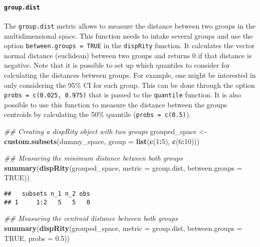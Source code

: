\documentclass[
]{book}
\newenvironment{Shaded}{\begin{snugshade}}{\end{snugshade}}
\newcommand{\CommentTok}[1]{\textcolor[rgb]{0.56,0.35,0.01}{\textit{#1}}}
\newcommand{\DataTypeTok}[1]{\textcolor[rgb]{0.13,0.29,0.53}{#1}}
\newcommand{\DecValTok}[1]{\textcolor[rgb]{0.00,0.00,0.81}{#1}}
\newcommand{\FloatTok}[1]{\textcolor[rgb]{0.00,0.00,0.81}{#1}}
\newcommand{\KeywordTok}[1]{\textcolor[rgb]{0.13,0.29,0.53}{\textbf{#1}}}
\newcommand{\NormalTok}[1]{#1}
\newcommand{\OperatorTok}[1]{\textcolor[rgb]{0.81,0.36,0.00}{\textbf{#1}}}
\newcommand{\OtherTok}[1]{\textcolor[rgb]{0.56,0.35,0.01}{#1}}
\newcommand{\StringTok}[1]{\textcolor[rgb]{0.31,0.60,0.02}{#1}}
\begin{document}
\hypertarget{group.dist}{%
\paragraph{\texorpdfstring{\texttt{group.dist}}{group.dist}}\label{group.dist}}

The \texttt{group.dist} metric allows to measure the distance between two groups in the multidimensional space.
This function needs to intake several groups and use the option \texttt{between.groups\ =\ TRUE} in the \texttt{dispRity} function.
It calculates the vector normal distance (euclidean) between two groups and returns 0 if that distance is negative.
Note that it is possible to set up which quantiles to consider for calculating the distances between groups.
For example, one might be interested in only considering the 95\% CI for each group.
This can be done through the option \texttt{probs\ =\ c(0.025,\ 0.975)} that is passed to the \texttt{quantile} function.
It is also possible to use this function to measure the distance between the groups centroids by calculating the 50\% quantile (\texttt{probs\ =\ c(0.5)}).

\begin{Shaded}
\begin{Highlighting}[]
\CommentTok{\#\# Creating a dispRity object with two groups}
\NormalTok{grouped\_space \textless{}{-}}\StringTok{ }\KeywordTok{custom.subsets}\NormalTok{(dummy\_space,}
                      \DataTypeTok{group =} \KeywordTok{list}\NormalTok{(}\KeywordTok{c}\NormalTok{(}\DecValTok{1}\OperatorTok{:}\DecValTok{5}\NormalTok{), }\KeywordTok{c}\NormalTok{(}\DecValTok{6}\OperatorTok{:}\DecValTok{10}\NormalTok{)))}

\CommentTok{\#\# Measuring the minimum distance between both groups}
\KeywordTok{summary}\NormalTok{(}\KeywordTok{dispRity}\NormalTok{(grouped\_space, }\DataTypeTok{metric =}\NormalTok{ group.dist,}
                 \DataTypeTok{between.groups =} \OtherTok{TRUE}\NormalTok{))}
\end{Highlighting}
\end{Shaded}

\begin{verbatim}
##   subsets n_1 n_2 obs
## 1     1:2   5   5   0
\end{verbatim}

\begin{Shaded}
\begin{Highlighting}[]
\CommentTok{\#\# Measuring the centroid distance between both groups}
\KeywordTok{summary}\NormalTok{(}\KeywordTok{dispRity}\NormalTok{(grouped\_space, }\DataTypeTok{metric =}\NormalTok{ group.dist,}
                 \DataTypeTok{between.groups =} \OtherTok{TRUE}\NormalTok{, }\DataTypeTok{probs =} \FloatTok{0.5}\NormalTok{))}
\end{Highlighting}
\end{Shaded}
\end{document}
